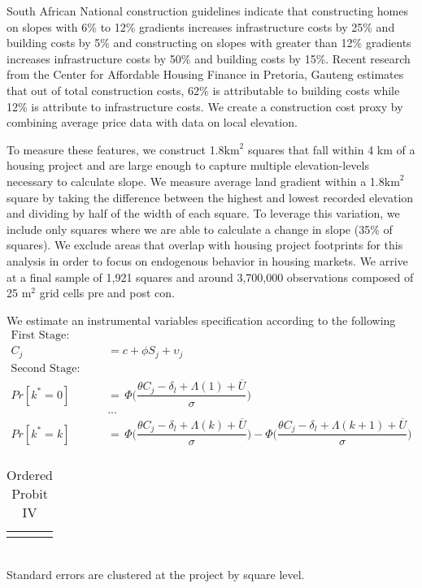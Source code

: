 \documentclass[12pt]{article}
\begin{document}
South African National construction guidelines indicate that constructing homes on slopes with 6\% to 12\% gradients increases infrastructure costs by 25\% and building costs by 5\% and constructing on slopes with greater than 12\% gradients increases infrastructure costs by 50\% and building costs by 15\%.  Recent research from the Center for Affordable Housing Finance in Pretoria, Gauteng estimates that out of total construction costs, 62\% is attributable to building costs while 12\% is attribute to infrastructure costs.  We create a construction cost proxy by combining average price data with data on local elevation.

To measure these features, we construct 1.8$\text{km}^{2}$ squares that fall within 4 km of a housing project and are large enough to capture multiple elevation-levels necessary to calculate slope.  We measure average land gradient within a 1.8$\text{km}^{2}$ square by taking the difference between the highest and lowest recorded elevation and dividing by half of the width of each square.  To leverage this variation, we include only squares where we are able to calculate a change in slope (35\% of squares).  We exclude areas that overlap with housing project footprints for this analysis in order to focus on endogenous behavior in housing markets.  We arrive at a final sample of 1,921 squares and around 3,700,000 observations composed of 25 $\text{m}^2$ grid cells pre and post con.

We estimate an instrumental variables specification according to the following 
\begin{align*}
\text{First Stage: Linear Regression} & \\
C_{j} &= c + \phi S_j + \upsilon_j \\ 
\text{Second Stage: Ordered Probit} & \\
Pr[ k^{*} =0 ] \, &= \, \Phi\Bigg(\dfrac{\theta C_{j} - \delta_{l} + \Lambda(1) + \overline{U}}{\sigma}\Bigg) \\
&... \\
Pr[ k^{*} =k ] \, &= \, \Phi\Bigg(\dfrac{\theta C_{j} - \delta_{l} + \Lambda(k) + \overline{U}}{\sigma}\Bigg) - \Phi\Bigg(\dfrac{\theta C_{j} - \delta_{l} + \Lambda(k+1) + \overline{U}}{\sigma}\Bigg) \\
\end{align*}



\begin{table}[h]
\centering
\caption{Ordered Probit IV}\label{table:ivreg_output}
\vspace{-2mm}
\begin{tabular}{lD}
\toprule



% 
% 
\bottomrule\\[-.6em]
\end{tabular}\\
Standard errors are clustered at the project by square level.  
\end{table}
\end{document}
